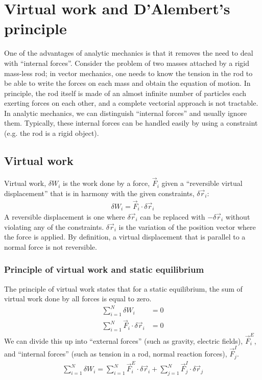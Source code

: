 %
\chapter{Virtual work and D'Alembert's principle}
One of the advantages of analytic mechanics is that it removes the need to deal with ``internal forces''. Consider the problem of two masses attached by a rigid mass-less rod; in vector mechanics, one needs to know the tension in the rod to be able to write the forces on each mass and obtain the equation of motion. In principle, the rod itself is made of an almost infinite number of particles each exerting forces on each other, and a complete vectorial approach is not tractable. In analytic mechanics, we can distinguish ``internal forces'' and usually ignore them. Typically, these internal forces can be handled easily by using a constraint (e.g. the rod is a rigid object).

\section{Virtual work}
Virtual work, $\delta W_i$ is the work done by a force, $\vec{F}_i$ given a ``reversible virtual displacement'' that is in harmony with the given constraints, $\delta\vec{r}_i$:
\begin{align}
\delta W_i = \vec{F}_i\cdot\delta\vec{r}_i
\end{align}
A reversible displacement is one where $\delta\vec{r}_i$ can be replaced with $-\delta\vec{r}_i$ without violating any of the constraints. $\delta\vec{r}_i$ is the variation of the position vector where the force is applied.  By definition, a virtual displacement that is parallel to a normal force is not reversible.

\subsection{Principle of virtual work and static equilibrium}
The principle of virtual work states that for a static equilibrium, the sum of virtual work done by all forces is equal to zero.
\begin{align}
\sum_{i=1}^N\delta W_i &= 0 \nonumber\\
\sum_{i=1}^N\vec{F}_i\cdot\delta\vec{r}_i &= 0
\end{align}
We can divide this up into ``external forces'' (such as gravity, electric fields), $\vec{F}^E_i$, and ``internal forces'' (such as tension in a rod, normal reaction forces), $\vec{F}^I_j$.
\begin{align}
\sum_{i=1}^N\delta W_i=\sum_{i=1}^N \vec{F}^E_i\cdot\delta\vec{r}_i + \sum_{j=1}^{N}\vec{F}^I_j\cdot\delta\vec{r}_j
\end{align}

